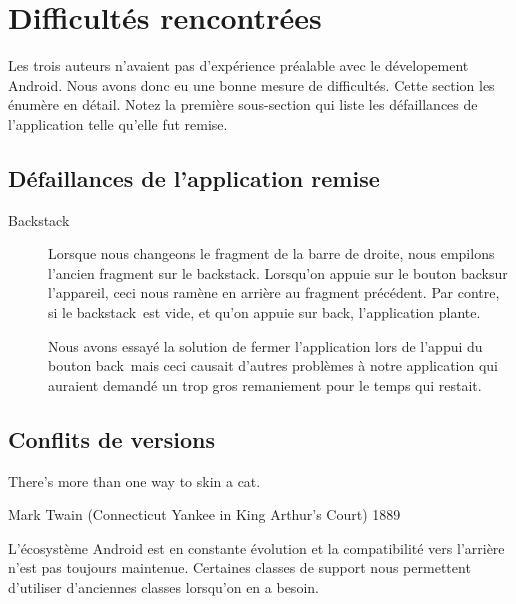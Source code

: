 \documentclass[12pt]{article}
\newcommand\code[1]{\texttt{#1}}
\begin{document}


\section{Difficultés rencontrées}

	Les trois auteurs n'avaient pas d'expérience préalable avec le dévelopement
	Android.  Nous avons donc eu une bonne mesure de difficultés.  Cette section
	les énumère en détail.  Notez la première sous-section qui liste les
	défaillances de l'application telle qu'elle fut remise.

\subsection{Défaillances de l'application remise}

	\begin{description}
		\item[Backstack]

			Lorsque nous changeons le fragment de la barre de droite, nous
			empilons l'ancien fragment sur le \og backstack\fg.  Lorsqu'on
			appuie sur le bouton \og back\fg sur l'appareil, ceci nous ramène en
			arrière au fragment précédent.  Par contre, si le \og backstack\fg\
			est vide, et qu'on appuie sur \og back\fg, l'application plante.

			Nous avons essayé la solution de fermer l'application lors de
			l'appui du bouton \og back\fg\ mais ceci causait d'autres problèmes
			à notre application qui auraient demandé un trop gros remaniement
			pour le temps qui restait.

	\end{description}

\subsection{Conflits de versions}

	{\center \og There's more than one way to skin a cat.\fg \\}
		\begin{flushright}
			{\flushright Mark Twain (Connecticut Yankee in King Arthur’s Court)
			1889}
		\end{flushright}

	L'écosystème Android est en constante évolution et la compatibilité vers
	l'arrière n'est pas toujours maintenue.  Certaines classes de support nous
	permettent d'utiliser d'anciennes classes lorsqu'on en a besoin.
\end{document}
